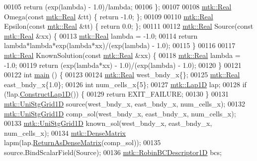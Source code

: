 \begin{DoxyCode}
00105   \textcolor{keywordflow}{return} (exp(lambda) - 1.0)/lambda;
00106 \};
00107 
00108 \hyperlink{group__c01-roots_gac080bbbf5cbb5502c9f00405f894857d}{mtk::Real} Omega(\textcolor{keyword}{const} \hyperlink{group__c01-roots_gac080bbbf5cbb5502c9f00405f894857d}{mtk::Real} &tt) \{ \textcolor{keywordflow}{return} -1.0; \};
00109 
00110 \hyperlink{group__c01-roots_gac080bbbf5cbb5502c9f00405f894857d}{mtk::Real} Epsilon(\textcolor{keyword}{const} \hyperlink{group__c01-roots_gac080bbbf5cbb5502c9f00405f894857d}{mtk::Real} &tt) \{ \textcolor{keywordflow}{return} 0.0; \};
00111 
00112 \hyperlink{group__c01-roots_gac080bbbf5cbb5502c9f00405f894857d}{mtk::Real} Source(\textcolor{keyword}{const} \hyperlink{group__c01-roots_gac080bbbf5cbb5502c9f00405f894857d}{mtk::Real} &xx) \{
00113   \hyperlink{group__c01-roots_gac080bbbf5cbb5502c9f00405f894857d}{mtk::Real} lambda = -1.0;
00114   \textcolor{keywordflow}{return} lambda*lambda*exp(lambda*xx)/(exp(lambda) - 1.0);
00115 \}
00116 
00117 \hyperlink{group__c01-roots_gac080bbbf5cbb5502c9f00405f894857d}{mtk::Real} KnownSolution(\textcolor{keyword}{const} \hyperlink{group__c01-roots_gac080bbbf5cbb5502c9f00405f894857d}{mtk::Real} &xx) \{
00118   \hyperlink{group__c01-roots_gac080bbbf5cbb5502c9f00405f894857d}{mtk::Real} lambda = -1.0;
00119   \textcolor{keywordflow}{return} (exp(lambda*xx) - 1.0)/(exp(lambda) - 1.0);
00120 \}
00121 
00122 \textcolor{keywordtype}{int} \hyperlink{minimalistic__poisson__1d_8cc_ae66f6b31b5ad750f1fe042a706a4e3d4}{main} () \{
00123 
00124   \hyperlink{group__c01-roots_gac080bbbf5cbb5502c9f00405f894857d}{mtk::Real} west\_bndy\_x\{\};
00125   \hyperlink{group__c01-roots_gac080bbbf5cbb5502c9f00405f894857d}{mtk::Real} east\_bndy\_x\{1.0\};
00126   \textcolor{keywordtype}{int} num\_cells\_x\{5\};
00127   \hyperlink{classmtk_1_1Lap1D}{mtk::Lap1D} lap;
00128   \textcolor{keywordflow}{if} (!lap.\hyperlink{classmtk_1_1Lap1D_a685dcba88c08cf5b7b6c2aa4669a472c}{ConstructLap1D}()) \{
00129     \textcolor{keywordflow}{return} EXIT\_FAILURE;
00130   \}
00131   \hyperlink{classmtk_1_1UniStgGrid1D}{mtk::UniStgGrid1D} source(west\_bndy\_x, east\_bndy\_x, num\_cells\_x);
00132   \hyperlink{classmtk_1_1UniStgGrid1D}{mtk::UniStgGrid1D} comp\_sol(west\_bndy\_x, east\_bndy\_x, num\_cells\_x);
00133   \hyperlink{classmtk_1_1UniStgGrid1D}{mtk::UniStgGrid1D} known\_sol(west\_bndy\_x, east\_bndy\_x, num\_cells\_x);
00134   \hyperlink{classmtk_1_1DenseMatrix}{mtk::DenseMatrix} lapm(lap.\hyperlink{classmtk_1_1Lap1D_aaea34a17b0879e05eb4109645a2ba8f4}{ReturnAsDenseMatrix}(comp\_sol));
00135   source.BindScalarField(Source);
00136   \hyperlink{classmtk_1_1RobinBCDescriptor1D}{mtk::RobinBCDescriptor1D} bcs;

\end{DoxyCode}

